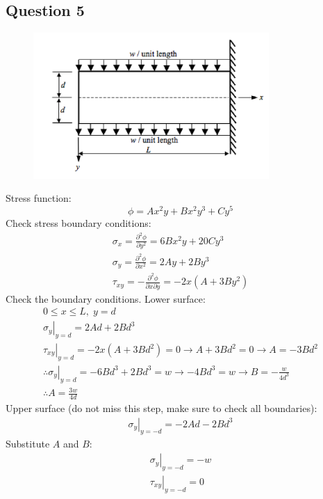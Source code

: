\documentclass[11pt]{article}
\numberwithin{equation}{section}
\begin{document}
\subsection{Question 5}
\begin{figure}[H]
    \centering
    \includegraphics[width = 0.8\textwidth]{./img/diagram1.png}
    \caption{}
\end{figure}
Stress function:
\begin{equation}
    \phi = Ax^2 y + Bx^2 y^3 + Cy^5
\end{equation}
Check stress boundary conditions:
\begin{gather}
    \sigma_x = \frac{\partial^2 \phi}{\partial y^2} = 6Bx^2 y + 20Cy^3\\
    \sigma_y = \frac{\partial^2 \phi}{\partial x^2} = 2Ay + 2By^3\\
    \tau_{xy} = -\frac{\partial^2 \phi}{\partial x\partial y} = -2x\left(A + 3By^2\right)
\end{gather}
Check the boundary conditions. Lower surface:
\begin{gather}
    0 \leq x \leq L, \; y = d\\
    \left. \sigma_y \right|_{y=d} = 2Ad + 2Bd^3 \\
    \left. \tau_{xy} \right|_{y=d} = -2x(A+3Bd^2) = 0 \rightarrow A + 3Bd^2 = 0 \rightarrow A = -3Bd^2\\
    \therefore \left. \sigma_y \right|_{y=d} = -6Bd^3 + 2Bd^3 = w \rightarrow -4Bd^3 = w \rightarrow B = - \frac{w}{4d^3}\\
    \therefore A = \frac{3w}{4d}
\end{gather}
Upper surface (do not miss this step, make sure to check all boundaries):
\begin{gather}
    \left. \sigma_y\right|_{y=-d} = -2Ad -2Bd^3
\end{gather}
Substitute $A$ and $B$:
\begin{gather}
    \left. \sigma_y\right|_{y=-d} = -w\\
    \left. \tau_{xy} \right|_{y=-d} = 0
\end{gather}
\end{document}
